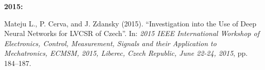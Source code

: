 \documentclass[FM,noheader,EN,bwtitles]{tulthesis}
\begin{document}
	\noindent \textbf{2015:}
	\begin{enumerate}[leftmargin=*,resume]
		Mateju L., P. Cerva, and J. Zdansky (2015). “Investigation into the Use of Deep Neural 
		Networks for LVCSR of Czech”. In: \textit{2015 IEEE International Workshop of Electronics, 
		Control, Measurement, Signals and their Application to Mechatronics, ECMSM, 
		2015, Liberec, Czech Republic, June 22-24, 2015}, pp. 184–187.
	\end{enumerate}
	
	
	
	
	
		
\end{document}
